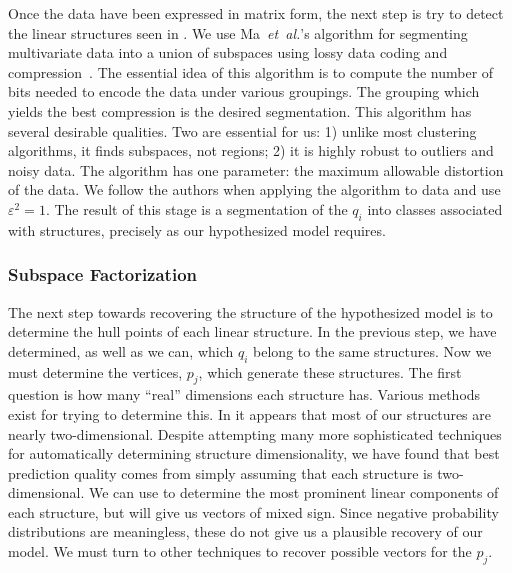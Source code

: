 \documentclass{acm_proc_article-sp}
\begin{document}
Once the data have been expressed in matrix form, the next step is try to detect the linear structures seen in .
We use Ma~\emph{et~al.}'s algorithm for segmenting multivariate data into a union of subspaces using lossy data coding and compression~\cite{Ma07}.
The essential idea of this algorithm is to compute the number of bits needed to encode the data under various groupings.
The grouping which yields the best compression is the desired segmentation.
This algorithm has several desirable qualities.
Two are essential for us:
1) unlike most clustering algorithms, it finds subspaces, not regions;
2) it is highly robust to outliers and noisy data.
The algorithm has one parameter:
the maximum allowable distortion of the data.
We follow the authors when applying the algorithm to  data and use $\varepsilon^2 = 1$.
The result of this stage is a segmentation of the $q_i$ into classes associated with structures, precisely as our hypothesized model requires.

\subsubsection{Subspace Factorization}


The next step towards recovering the structure of the hypothesized model is to determine the hull points of each linear structure.
In the previous step, we have determined, as well as we can, which $q_i$ belong to the same structures.
Now we must determine the vertices, $p_j$, which generate these structures.
The first question is how many ``real'' dimensions each structure has.
Various methods exist for trying to determine this.
In  it appears that most of our structures are nearly two-dimensional.
Despite attempting many more sophisticated techniques for automatically determining structure dimensionality, we have found that best prediction quality comes from simply assuming that each structure is two-dimensional.
We can use  to determine the most prominent linear components of each structure, but  will give us vectors of mixed sign.\svdnnnote
Since negative probability distributions are meaningless, these do not give us a plausible recovery of our model.
We must turn to other techniques to recover possible vectors for the $p_j$.
\end{document}

